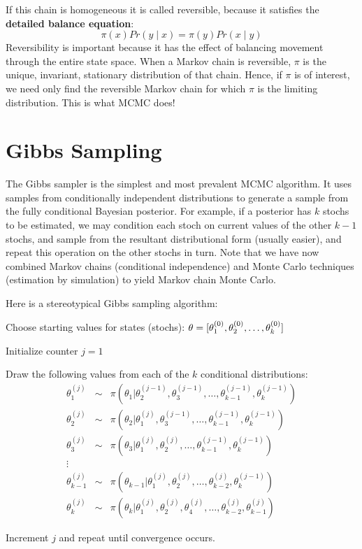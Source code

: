 \documentclass[]{book}
\begin{document}
\noindent If this chain is homogeneous it is called reversible, because it satisfies the \textbf{detailed balance equation}:
\[
\pi(x)Pr(y \mid x) = \pi(y) Pr(x \mid y)
\]
Reversibility is important because it has the effect of balancing movement through the entire state space. When a Markov chain is reversible, $\pi$ is the unique, invariant, stationary distribution of that chain.
Hence, if $\pi$ is of interest, we need only find the reversible Markov chain for which $\pi$ is the limiting distribution. This is what MCMC does!


\section{Gibbs Sampling}

The Gibbs sampler is the simplest and most prevalent MCMC algorithm. It uses samples from conditionally independent distributions to generate a sample from the fully conditional Bayesian posterior. For example, if a posterior has $k$ stochs to be estimated, we may condition each stoch on current values of the other $k-1$ stochs, and sample from the resultant distributional form (usually easier), and repeat this operation on the other stochs in turn. Note that we have now combined Markov chains (conditional independence) and Monte Carlo techniques (estimation by simulation) to yield Markov chain Monte Carlo.

Here is a stereotypical Gibbs sampling algorithm:

\begin{list}{}
{}
\item Choose starting values for states (stochs): ${\bf \theta} = [\theta_1^{(0)},\theta_2^{(0)},\ldots,\theta_k^{(0)}]$
\item Initialize counter $j=1$
\item Draw the following values from each of the $k$ conditional distributions:
\begin{eqnarray*}
\theta_1^{(j)} &\sim& \pi(\theta_1 | \theta_2^{(j-1)},\theta_3^{(j-1)},\ldots,\theta_{k-1}^{(j-1)},\theta_k^{(j-1)}) \\
\theta_2^{(j)} &\sim& \pi(\theta_2 | \theta_1^{(j)},\theta_3^{(j-1)},\ldots,\theta_{k-1}^{(j-1)},\theta_k^{(j-1)}) \\
\theta_3^{(j)} &\sim& \pi(\theta_3 | \theta_1^{(j)},\theta_2^{(j)},\ldots,\theta_{k-1}^{(j-1)},\theta_k^{(j-1)}) \\
\vdots \\
\theta_{k-1}^{(j)} &\sim& \pi(\theta_{k-1} | \theta_1^{(j)},\theta_2^{(j)},\ldots,\theta_{k-2}^{(j)},\theta_k^{(j-1)}) \\
\theta_k^{(j)} &\sim& \pi(\theta_k | \theta_1^{(j)},\theta_2^{(j)},\theta_4^{(j)},\ldots,\theta_{k-2}^{(j)},\theta_{k-1}^{(j)})
\end{eqnarray*}
\item Increment $j$ and repeat until convergence occurs.
\end{list}
\end{document}
